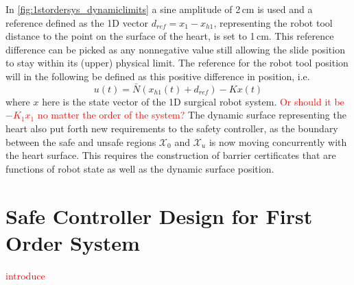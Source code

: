 In \autoref{fig:1stordersys_dynamiclimits} a sine amplitude of 2\,cm is used and a reference defined as the 1D vector $d_{ref}=x_1-x_{h1}$, representing the robot tool distance to the point on the surface of the heart, is set to 1\,cm. This reference difference can be picked as any nonnegative value still allowing the slide position to stay within its (upper) physical limit.
The reference for the robot tool position will in the following be defined as this positive difference in position, i.e.
\begin{equation}
u(t) = \bar{N}(x_{h1}(t)+d_{ref})-Kx(t)
\end{equation}
where $x$ here is the state vector of the 1D surgical robot system. \textcolor{red}{Or should it be $-K_1x_1$ no matter the order of the system?}
The dynamic surface representing the heart also put forth new requirements to the safety controller, as the boundary between the safe and unsafe regions $\mathcal{X}_0$ and $\mathcal{X}_u$ is now moving concurrently with the heart surface. This requires the construction of barrier certificates that are functions of robot state as well as the dynamic surface position.



\section{Safe Controller Design for First Order System}
\textcolor{red}{introduce}

